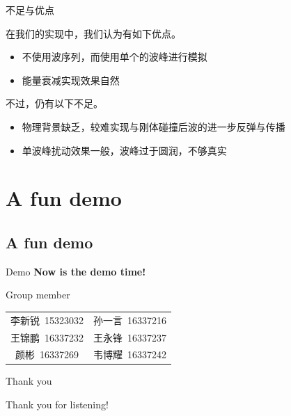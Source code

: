 \documentclass[handout,t]{beamer}
\begin{document}
\begin{frame}{不足与优点}
  
在我们的实现中，我们认为有如下优点。

\begin{itemize}
  \item 不使用波序列，而使用单个的波峰进行模拟
  \item 能量衰减实现效果自然
\end{itemize}
    
不过，仍有以下不足。

\begin{itemize}
  \item 物理背景缺乏，较难实现与刚体碰撞后波的进一步反弹与传播
  \item 单波峰扰动效果一般，波峰过于圆润，不够真实
\end{itemize}

    
\end{frame}



\section{A fun demo}
\subsection{A fun demo}
\begin{frame}{Demo}
  \centering
  \Huge \textbf{\textcolor[rgb]{0,0,1}{Now is the demo time!}}
\end{frame}

\begin{frame}{Group member}
 \large
  \begin{center}
    \begin{tabular}{cc}%
    李新锐\ 15323032&孙一言\ 16337216\\
    王锦鹏\ 16337232&王永锋\ 16337237\\
    颜彬\ 16337269&韦博耀\ 16337242
    \end{tabular}
  \end{center}
\end{frame}

\begin{frame}{Thank you}
  \begin{center}
    \Huge Thank you for listening!
  \end{center}
\end{frame}
\end{document}
